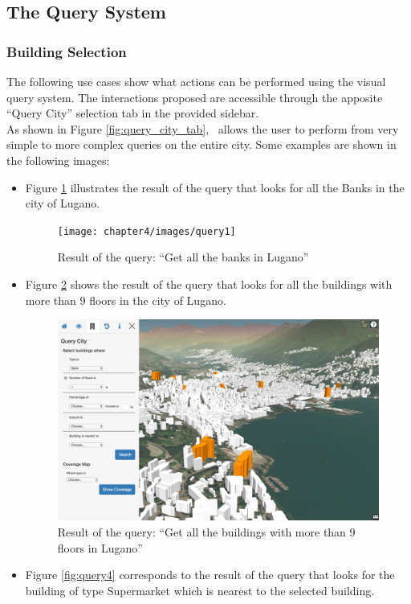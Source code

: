 \subsection{The Query System}
\subsubsection{Building Selection}
The following use cases show what actions can be performed using the visual query system. The interactions proposed are accessible through the apposite ``Query City'' selection tab in the provided sidebar.\\
As shown in Figure \ref{fig:query_city_tab}, \applicationName\ allows the user to perform from very simple to more complex queries on the entire city. Some examples are shown in the following images:
\begin{itemize}
	\item Figure \ref{fig:query1} illustrates the result of the query that looks for all the Banks in the city of Lugano.
	\begin{figure} [H]
\centering
\texttt{[image: chapter4/images/query1]}
\caption{Result of the query: ``Get all the banks in Lugano''}
\label{fig:query1}
\end{figure}  
	\item Figure \ref{fig:query2} shows the result of the query that looks for all the buildings with more than 9 floors in the city of Lugano.
	\begin{figure} [H]
\centering
\includegraphics[width=.8\textwidth]{chapter4/images/query2}
\caption{Result of the query: ``Get all the buildings with more than 9 floors in Lugano''}
\label{fig:query2}
\end{figure} 
	\item Figure \ref{fig:query4} corresponds to the result of the query that looks for the building of type Supermarket which is nearest to the selected building.

\end{itemize}
